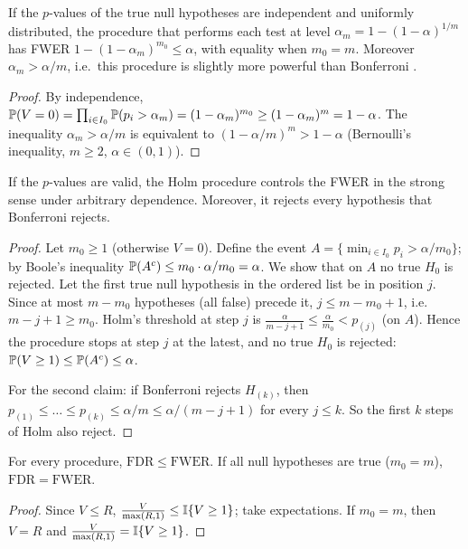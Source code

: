 \documentclass[main.tex]{subfiles}
\begin{document}
\begin{theorem}[Šidák]\label{thm:sidak}
If the $p$-values of the true null hypotheses are independent and uniformly distributed, the procedure that performs each test at level $\alpha_m=1-(1-\alpha)^{1/m}$ has FWER $1-(1-\alpha_m)^{m_0}\le\alpha$, with equality when $m_0=m$. Moreover $\alpha_m>\alpha/m$, i.e.\ this procedure is slightly more powerful than Bonferroni \cite{sidak67}.
\end{theorem}
\begin{proof}
By independence, $\P(V=0)=\prod_{i\in I_0}\P(p_i>\alpha_m)=(1-\alpha_m)^{m_0}\ge(1-\alpha_m)^m=1-\alpha$. The inequality $\alpha_m>\alpha/m$ is equivalent to $(1-\alpha/m)^m>1-\alpha$ (Bernoulli's inequality, $m\ge2$, $\alpha\in(0,1)$).
\end{proof}

\begin{theorem}\label{thm:holm}
If the $p$-values are valid, the Holm procedure controls the FWER in the strong sense under arbitrary dependence. Moreover, it rejects every hypothesis that Bonferroni rejects.
\end{theorem}
\begin{proof}
Let $m_0\ge1$ (otherwise $V=0$). Define the event $A=\{\min_{i\in I_0}p_i>\alpha/m_0\}$; by Boole's inequality $\P(A^c)\le m_0\cdot\alpha/m_0=\alpha$. We show that on $A$ no true $H_0$ is rejected. Let the first true null hypothesis in the ordered list be in position $j$. Since at most $m-m_0$ hypotheses (all false) precede it, $j\le m-m_0+1$, i.e.\ $m-j+1\ge m_0$. Holm's threshold at step $j$ is $\frac\alpha{m-j+1}\le\frac\alpha{m_0}<p_{(j)}$ (on $A$). Hence the procedure stops at step $j$ at the latest, and no true $H_0$ is rejected: $\P(V\ge1)\le\P(A^c)\le\alpha$.

For the second claim: if Bonferroni rejects $H_{(k)}$, then $p_{(1)}\le\dots\le p_{(k)}\le\alpha/m\le\alpha/(m-j+1)$ for every $j\le k$. So the first $k$ steps of Holm also reject.
\end{proof}

\begin{proposition}\label{prop:fdr-fwer}
For every procedure, $\mathrm{FDR}\le\mathrm{FWER}$. If all null hypotheses are true ($m_0=m$), $\mathrm{FDR}=\mathrm{FWER}$.
\end{proposition}
\begin{proof}
Since $V\le R$, $\frac{V}{\max(R,1)}\le\I\{V\ge1\}$; take expectations. If $m_0=m$, then $V=R$ and $\frac{V}{\max(R,1)}=\I\{V\ge1\}$.
\end{proof}
\end{document}
